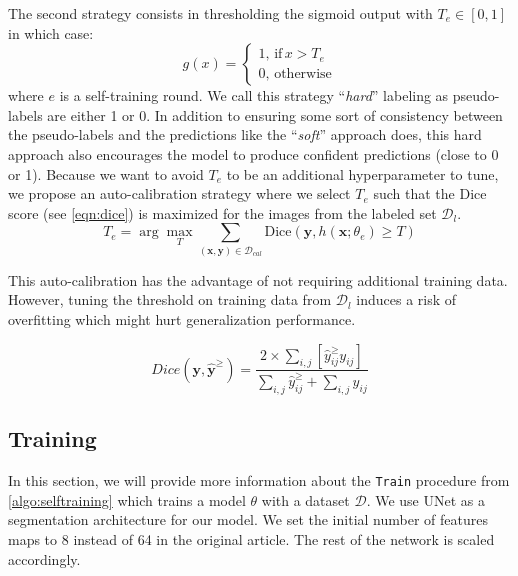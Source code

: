 The second strategy consists in thresholding the sigmoid output with $T_e \in [0, 1]$ in which case:
\begin{equation}
g(x) = \begin{cases}
1,\,\text{if}\, x > T_e\\
0,\,\text{otherwise}
\end{cases}
\end{equation}   
where $e$ is a self-training round. We call this strategy ``\textit{hard}'' labeling as pseudo-labels are either 1 or 0. In addition to ensuring some sort of consistency between the pseudo-labels and the predictions like the ``\textit{soft}'' approach does, this hard approach also encourages the model to produce confident predictions (close to 0 or 1). Because we want to avoid $T_e$ to be an additional hyperparameter to tune, we propose an auto-calibration strategy where we select $T_e$ such that the Dice score (see \cref{eqn:dice}) is maximized for the images from the labeled set $\mathcal{D}_{l}$.
\begin{equation}
T_e = \arg \underset{T}{\max} \sum_{(\mathbf{x}, \mathbf{y}) \in \mathcal{D}_{cal}} \text{Dice}\left(\mathbf{y},h( \mathbf{x}; \theta_{e}) \geq T\right)
\label{eqn:thresholdopt}
\end{equation}

This auto-calibration has the advantage of not requiring additional training data. However, tuning the threshold on training data from $\mathcal{D}_l$ induces a risk of overfitting which might hurt generalization performance.

\begin{equation}
Dice(\mathbf{y},\hat{\mathbf{y}}^{\geq}) = \dfrac{2 \times \sum_{i,j} \left[\hat{y}^{\geq}_{ij} y_{ij}\right]}{\sum_{i,j} \hat{y}^{\geq}_{ij} + \sum_{i,j} y_{ij}}
\label{eqn:dice}
\end{equation}


\subsection{Training}
\label{ssec:training_protocol}

In this section, we will provide more information about the \texttt{Train} procedure from \cref{algo:selftraining} which trains a model $\theta$ with a dataset $\mathcal{D}$.
We use UNet \cite{ronneberger2015unet} as a segmentation architecture for our model. We set the initial number of features maps to 8 instead of 64 in the original article. The rest of the network is scaled accordingly. 

